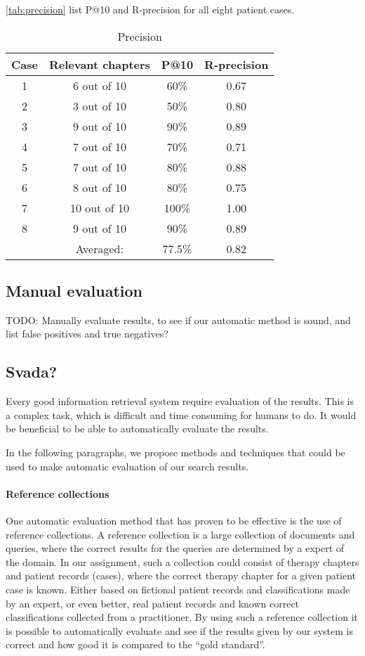 \documentclass[a4paper, 11pt]{article}
\begin{document}
\autoref{tab:precision} list P@10 and R-precision for all eight patient cases.
\begin{table}[tbp] \footnotesize \center
\caption{Precision\label{tab:precision}}
\begin{tabular}{c c c c}
    \toprule
    Case & Relevant chapters & P@10 & R-precision \\
    \midrule
	1 & 6 out of 10 & 60\% & 0.67 \\
	2 & 3 out of 10 & 50\% & 0.80 \\
	3 & 9 out of 10 & 90\% & 0.89 \\
	4 & 7 out of 10 & 70\% & 0.71 \\
	5 & 7 out of 10 & 80\% & 0.88 \\
	6 & 8 out of 10 & 80\% & 0.75 \\
	7 & 10 out of 10 & 100\% & 1.00 \\
	8 & 9 out of 10 & 90\% & 0.89 \\
    \midrule
	& Averaged: & 77.5\% & 0.82 \\
	\bottomrule
\end{tabular}
\end{table}


\subsection{Manual evaluation}
TODO: Manually evaluate results, to see if our automatic method is sound, and list false positives and true negatives?


\subsection{Svada?}
Every good information retrieval system require evaluation of the results. This is a complex task, which is difficult and time consuming for humans to do. It would be beneficial to be able to automatically evaluate the results.

In the following paragraphs, we propose methods and techniques that could be used to make automatic evaluation of our search results.

\paragraph{Reference collections}
One automatic evaluation method that has proven to be effective is the use of reference collections. A reference collection is a large collection of documents and queries, where the correct results for the queries are determined by a expert of the domain.
In our assignment, such a collection could consist of therapy chapters and patient records (cases), where the correct therapy chapter for a given patient case is known. Either based on fictional patient records and classifications made by an expert, or even better, real patient records and known correct classifications collected from a practitioner. 
By using such a reference collection it is possible to automatically evaluate and see if the results given by our system is correct and how good it is compared to the ``gold standard''.
\end{document}
